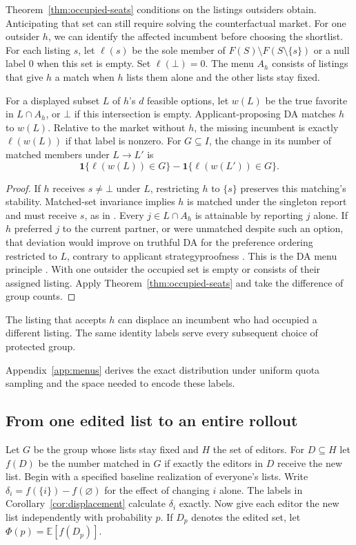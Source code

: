Theorem~\ref{thm:occupied-seats} conditions on the listings outsiders obtain. Anticipating that set can still require solving the counterfactual market. For one outsider $h$, we can identify the affected incumbent before choosing the shortlist. For each listing $s$, let $\ell(s)$ be the sole member of $F(S)\setminus F(S\setminus\{s\})$ or a null label $0$ when this set is empty. Set $\ell(\bot)=0$. The menu $A_h$ consists of listings that give $h$ a match when $h$ lists them alone and the other lists stay fixed.

\begin{corollary}\label{cor:displacement}
For a displayed subset $L$ of $h$'s $d$ feasible options, let $w(L)$ be the true favorite in $L\cap A_h$, or $\bot$ if this intersection is empty. Applicant-proposing DA matches $h$ to $w(L)$. Relative to the market without $h$, the missing incumbent is exactly $\ell(w(L))$ if that label is nonzero. For $G\subseteq I$, the change in its number of matched members under $L\to L'$ is
\[
 \mathbf1\{\ell(w(L))\in G\}-\mathbf1\{\ell(w(L'))\in G\}.
\]
\end{corollary}
\begin{proof}
If $h$ receives $s\ne\bot$ under $L$, restricting $h$ to $\{s\}$ preserves this matching's stability. Matched-set invariance implies $h$ is matched under the singleton report and must receive $s$, as in \citep{papai}. Every $j\in L\cap A_h$ is attainable by reporting $j$ alone. If $h$ preferred $j$ to the current partner, or were unmatched despite such an option, that deviation would improve on truthful DA for the preference ordering restricted to $L$, contrary to applicant strategyproofness \citep{roth82}. This is the DA menu principle \citep{menus}. With one outsider the occupied set is empty or consists of their assigned listing. Apply Theorem~\ref{thm:occupied-seats} and take the difference of group counts.
\end{proof}

The listing that accepts $h$ can displace an incumbent who had occupied a different listing. The same identity labels serve every subsequent choice of protected group.

Appendix~\ref{app:menus} derives the exact distribution under uniform quota sampling and the space needed to encode these labels.

\subsection{From one edited list to an entire rollout}
Let $G$ be the group whose lists stay fixed and $H$ the set of editors. For $D\subseteq H$ let $f(D)$ be the number matched in $G$ if exactly the editors in $D$ receive the new list. Begin with a specified baseline realization of everyone's lists. Write $\delta_i=f(\{i\})-f(\varnothing)$ for the effect of changing $i$ alone. The labels in Corollary~\ref{cor:displacement} calculate $\delta_i$ exactly. Now give each editor the new list independently with probability $p$. If $D_p$ denotes the edited set, let $\Phi(p)=\mathbb{E}[f(D_p)]$.

